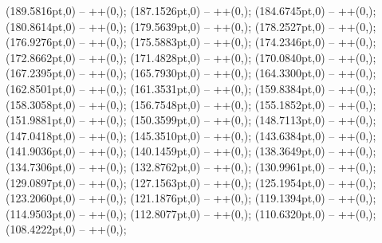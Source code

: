 {   (189.5816pt,0) -- ++(0,\doiscentesimos);
   (187.1526pt,0) -- ++(0,\doiscentesimos);
   (184.6745pt,0) -- ++(0,\doiscentesimos);
   (180.8614pt,0) -- ++(0,\centesimos);
   (179.5639pt,0) -- ++(0,\centesimos);
   (178.2527pt,0) -- ++(0,\centesimos);
   (176.9276pt,0) -- ++(0,\centesimos);
   (175.5883pt,0) -- ++(0,\centesimos);
   (174.2346pt,0) -- ++(0,\centesimos);
   (172.8662pt,0) -- ++(0,\centesimos);
   (171.4828pt,0) -- ++(0,\centesimos);
   (170.0840pt,0) -- ++(0,\centesimos);
   (167.2395pt,0) -- ++(0,\centesimos);
   (165.7930pt,0) -- ++(0,\centesimos);
   (164.3300pt,0) -- ++(0,\centesimos);
   (162.8501pt,0) -- ++(0,\centesimos);
   (161.3531pt,0) -- ++(0,\centesimos);
   (159.8384pt,0) -- ++(0,\centesimos);
   (158.3058pt,0) -- ++(0,\centesimos);
   (156.7548pt,0) -- ++(0,\centesimos);
   (155.1852pt,0) -- ++(0,\centesimos);
   (151.9881pt,0) -- ++(0,\centesimos);
   (150.3599pt,0) -- ++(0,\centesimos);
   (148.7113pt,0) -- ++(0,\centesimos);
   (147.0418pt,0) -- ++(0,\centesimos);
   (145.3510pt,0) -- ++(0,\centesimos);
   (143.6384pt,0) -- ++(0,\centesimos);
   (141.9036pt,0) -- ++(0,\centesimos);
   (140.1459pt,0) -- ++(0,\centesimos);
   (138.3649pt,0) -- ++(0,\centesimos);
   (134.7306pt,0) -- ++(0,\centesimos);
   (132.8762pt,0) -- ++(0,\centesimos);
   (130.9961pt,0) -- ++(0,\centesimos);
   (129.0897pt,0) -- ++(0,\centesimos);
   (127.1563pt,0) -- ++(0,\centesimos);
   (125.1954pt,0) -- ++(0,\centesimos);
   (123.2060pt,0) -- ++(0,\centesimos);
   (121.1876pt,0) -- ++(0,\centesimos);
   (119.1394pt,0) -- ++(0,\centesimos);
   (114.9503pt,0) -- ++(0,\centesimos);
   (112.8077pt,0) -- ++(0,\centesimos);
   (110.6320pt,0) -- ++(0,\centesimos);
   (108.4222pt,0) -- ++(0,\centesimos);
}
